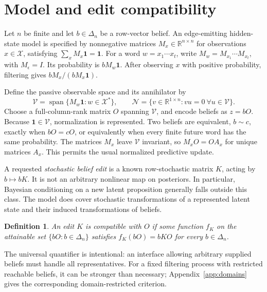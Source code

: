 \documentclass[11pt,letterpaper]{article}
\newtheorem{definition}[theorem]{Definition}
\newcommand{\one}{\mathbf{1}}
\newcommand{\spn}{\operatorname{span}}
\newcommand{\V}{\mathcal{V}}
\newcommand{\N}{\mathcal{N}}
\newcommand{\D}{\Delta}
\begin{document}
\section{Model and edit compatibility}
Let $n$ be finite and let $b\in\D_n$ be a row-vector belief. An edge-emitting hidden-state model is specified by nonnegative matrices $M_x\in\mathbb R^{n\times n}$ for observations $x\in\mathcal X$, satisfying $\sum_x M_x\one=\one$. For a word $w=x_1\cdots x_t$, write $M_w=M_{x_1}\cdots M_{x_t}$, with $M_\epsilon=I$. Its probability is $bM_w\one$. After observing $x$ with positive probability, filtering gives $bM_x/(bM_x\one)$.

Define the passive observable space and its annihilator by
\begin{equation}
 \V=\spn\{M_w\one:w\in\mathcal X^*\},\qquad
 \N=\{v\in\mathbb R^{1\times n}:v u=0\ \forall u\in\V\}.
\end{equation}
Choose a full-column-rank matrix $O$ spanning $\V$, and encode beliefs as $z=bO$. Because $\one\in\V$, normalization is represented. Two beliefs are equivalent, $b\sim c$, exactly when $bO=cO$, or equivalently when every finite future word has the same probability. The matrices $M_x$ leave $\V$ invariant, so $M_xO=OA_x$ for unique matrices $A_x$. This permits the usual normalized predictive update.

A requested \emph{stochastic belief edit} is a known row-stochastic matrix $K$, acting by $b\mapsto bK$. It is not an arbitrary nonlinear map on posteriors. In particular, Bayesian conditioning on a new latent proposition generally falls outside this class. The model does cover stochastic transformations of a represented latent state and their induced transformations of beliefs.

\begin{definition}
An edit $K$ is \emph{compatible} with $O$ if some function $f_K$ on the attainable set $\{bO:b\in\D_n\}$ satisfies $f_K(bO)=bKO$ for every $b\in\D_n$.
\end{definition}

The universal quantifier is intentional: an interface allowing arbitrary supplied beliefs must handle all representatives. For a fixed filtering process with restricted reachable beliefs, it can be stronger than necessary; Appendix~\ref{app:domains} gives the corresponding domain-restricted criterion.
\end{document}
